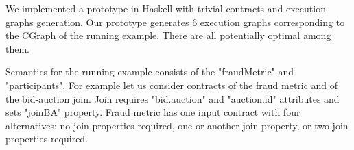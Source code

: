 We implemented a prototype in Haskell with trivial contracts and execution graphs generation.
Our prototype generates 6 execution graphs corresponding to the CGraph of the running example.
There are all potentially optimal among them.

Semantics for the running example consists of the "fraudMetric" and "participants".
For example let us consider contracts of the fraud metric and of the bid-auction join.
Join requires "bid.auction" and "auction.id" attributes and sets "joinBA" property.
Fraud metric has one input contract with four alternatives: no join properties required, one or another join property, or two join properties required.
